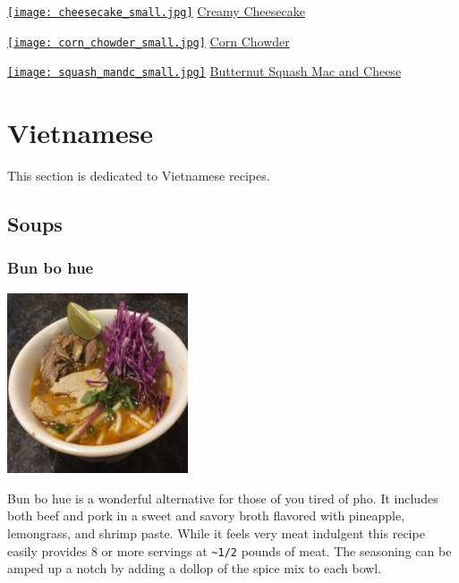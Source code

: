 \documentclass[
]{book}
\begin{document}
\protect\hyperlink{cheesecake}{\texttt{[image: cheesecake\_small.jpg]}}
\protect\hyperlink{cheesecake}{Creamy Cheesecake}

\protect\hyperlink{cornchowder}{\texttt{[image: corn\_chowder\_small.jpg]}}
\protect\hyperlink{cornchowder}{Corn Chowder}

\protect\hyperlink{squashmc}{\texttt{[image: squash\_mandc\_small.jpg]}}
\protect\hyperlink{squashmc}{Butternut Squash Mac and Cheese}

\hypertarget{viet}{%
\chapter*{Vietnamese}\label{viet}}

This section is dedicated to Vietnamese recipes.

\hypertarget{soups}{%
\section*{Soups}\label{soups}}

\hypertarget{bohue}{%
\subsection*{Bun bo hue}\label{bohue}}

\includegraphics[width=0.4\textwidth,height=\textheight]{bun_bo_hue_small.jpg}

Bun bo hue is a wonderful alternative for those of you tired of pho. It includes both beef and pork in a sweet and savory broth flavored with pineapple, lemongrass, and shrimp paste. While it feels very meat indulgent this recipe easily provides 8 or more servings at \texttt{\textasciitilde{}1/2} pounds of meat. The seasoning can be amped up a notch by adding a dollop of the spice mix to each bowl.
\end{document}
